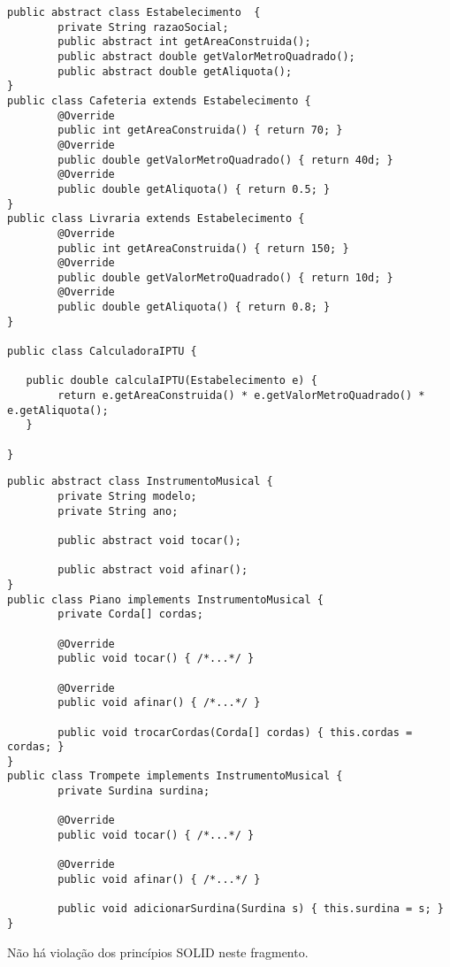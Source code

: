 \documentclass{lib/eng_softdoc}
\begin{document}
\begin{lstlisting}
public abstract class Estabelecimento  {
        private String razaoSocial;
        public abstract int getAreaConstruida();
        public abstract double getValorMetroQuadrado();
        public abstract double getAliquota();
}
public class Cafeteria extends Estabelecimento {
        @Override
        public int getAreaConstruida() { return 70; }
        @Override
        public double getValorMetroQuadrado() { return 40d; }
        @Override
        public double getAliquota() { return 0.5; }
}
public class Livraria extends Estabelecimento {
        @Override
        public int getAreaConstruida() { return 150; }
        @Override
        public double getValorMetroQuadrado() { return 10d; }
        @Override
        public double getAliquota() { return 0.8; }
}

public class CalculadoraIPTU {

   public double calculaIPTU(Estabelecimento e) {
        return e.getAreaConstruida() * e.getValorMetroQuadrado() * e.getAliquota();
   }

}
\end{lstlisting}

\vspace{0.25cm}
\subproblem
\begin{lstlisting}
public abstract class InstrumentoMusical {
        private String modelo;
        private String ano;

        public abstract void tocar();

        public abstract void afinar();
}
public class Piano implements InstrumentoMusical {
        private Corda[] cordas;

        @Override
        public void tocar() { /*...*/ }

        @Override
        public void afinar() { /*...*/ }

        public void trocarCordas(Corda[] cordas) { this.cordas = cordas; }
}
public class Trompete implements InstrumentoMusical {
        private Surdina surdina;

        @Override
        public void tocar() { /*...*/ }

        @Override
        public void afinar() { /*...*/ }

        public void adicionarSurdina(Surdina s) { this.surdina = s; } 
}
\end{lstlisting}

\answer Não há violação dos princípios SOLID neste fragmento.
\vspace{1cm}
\end{document}

